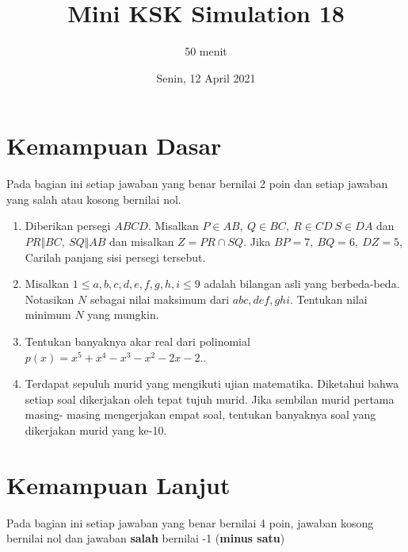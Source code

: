\documentclass[12pt]{scrartcl}
\title{Mini KSK Simulation 18}
\author{50 menit}
\date{Senin, 12 April 2021}
\begin{document}
	\maketitle

\renewcommand*\contentsname{Daftar Isi}
\tableofcontents

\newpage
	
	\section{Kemampuan Dasar}
	Pada bagian ini setiap jawaban yang benar bernilai 2 poin dan setiap jawaban yang salah
	atau kosong bernilai nol.
	\begin{enumerate}
		\item Diberikan persegi $ABCD$. Misalkan $P\in{AB},\ Q\in{BC},\ R\in{CD}\ S\in{DA}$ dan $PR\Vert BC,\ SQ\Vert AB$ dan misalkan $Z=PR\cap SQ$. Jika $BP=7,\ BQ=6,\ DZ=5$, Carilah panjang sisi persegi tersebut.
		
		\item Misalkan $1 \le a,b,c,d,e,f,g,h,i \le 9$ adalah bilangan asli yang berbeda-beda. Notasikan $N$ sebagai nilai maksimum dari $abc, def, ghi$. Tentukan nilai minimum $N$ yang mungkin.
		
		\item
		Tentukan banyaknya akar real dari polinomial $p(x)=x^5+x^4-x^3-x^2-2x-2.$.
		
		\item Terdapat sepuluh murid yang mengikuti ujian matematika. Diketahui bahwa setiap soal dikerjakan oleh tepat tujuh murid. Jika sembilan murid pertama masing-
		masing mengerjakan empat soal, tentukan banyaknya soal yang dikerjakan murid yang ke-10.
	\end{enumerate}

\section{Kemampuan Lanjut}
Pada bagian ini setiap jawaban yang benar bernilai 4 poin, jawaban kosong bernilai nol
dan jawaban \textbf{salah} bernilai -1 (\textbf{minus satu})
\end{document}

